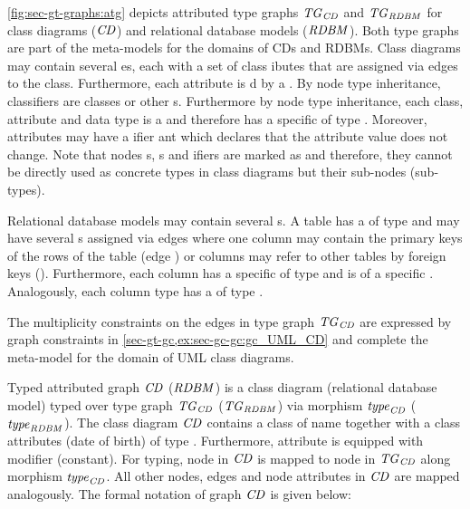 \begin{example}
\label{ex:sec-gt-graph:type_graph}
\cref{fig:sec-gt-graphs:atg} depicts attributed type graphs $\mathit{TG}_\mathit{CD}$ and $\mathit{TG}_\mathit{RDBM}$ for class diagrams ($\mathit{CD}$) and relational database models ($\mathit{RDBM}$).
Both type graphs are part of the meta-models for the domains of CDs and RDBMs.
Class diagrams may contain several es, each with a set of class ibutes that are assigned via  edges to the class.
Furthermore, each attribute is d by a .
By node type inheritance, classifiers are classes or other s.
Furthermore by node type inheritance, each class, attribute and data type is a  and therefore has a specific  of type .
Moreover, attributes may have a ifier ant which declares that the attribute value does not change.
Note that nodes s, s and ifiers are marked as  and therefore, they cannot be directly used as concrete types in class diagrams but their sub-nodes (sub-types).

Relational database models may contain several s.
A table has a  of type  and may have several s assigned via  edges where one column may contain the primary keys of the rows of the table (edge ) or columns may refer to other tables by foreign keys ().
Furthermore, each column has a specific  of type  and is of a specific .
Analogously, each column type has a  of type .

The multiplicity constraints on the edges in type graph $\mathit{TG}_\mathit{CD}$ are expressed by graph constraints in \cref{sec-gt-gc,ex:sec-gc-gc:gc_UML_CD} and complete the meta-model for the domain of UML class diagrams.

Typed attributed graph $\mathit{CD}$ ($\mathit{RDBM}$) is a class diagram (relational database model) typed over type graph $\mathit{TG}_\mathit{CD}$ ($\mathit{TG}_\mathit{RDBM}$) via morphism $\mathit{type}_\mathit{CD}$ ($\mathit{type}_{\mathit{RDBM}}$).
The class diagram $\mathit{CD}$ contains a class of name  together with a class attributes  (date of birth) of type .
Furthermore, attribute  is equipped with modifier  (constant).
For typing, node  in $\mathit{CD}$ is mapped to node  in $\mathit{TG}_\mathit{CD}$ along morphism $\mathit{type}_\mathit{CD}$.
All other nodes, edges and node attributes in $\mathit{CD}$ are mapped analogously.
The formal notation of graph $\mathit{CD}$ is given below:

\end{example}
